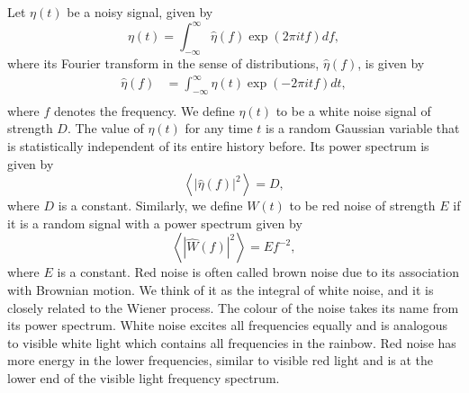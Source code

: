 Let $\eta(t)$ be a noisy signal, given by
\begin{equation}
    \eta(t) = \int_{-\infty}^\infty \hat{\eta}(f)\exp(2\pi i t f) df,
\end{equation}
where its Fourier transform in the sense of distributions, $\hat{\eta}(f)$, is given by
\begin{equation}
    \begin{aligned}
    \hat{\eta}(f) &= \int_{-\infty}^\infty \eta(t)\exp(-2\pi i t f) dt, \\
    \end{aligned}
\end{equation}
where $f$ denotes the frequency. We define $\eta(t)$ to be a white noise signal of strength $D$. The value of $\eta(t)$ for any time $t$ is a random Gaussian variable that is statistically independent of its entire history before. Its power spectrum is given by
\begin{equation}
    \left\langle|\hat{\eta}(f)|^2\right\rangle = D,
\end{equation}
where $D$ is a constant.
Similarly, we define $W(t)$ to be red noise of strength $E$ if it is a random signal with a power spectrum given by
\begin{equation}
    \left\langle|\hat{W}(f)|^2\right\rangle = E f^{-2},
\end{equation}
where $E$ is a constant. Red noise is often called brown noise due to its association with Brownian motion. We think of it as the integral of white noise, and it is closely related to the Wiener process. The colour of the noise takes its name from its power spectrum. White noise excites all frequencies equally and is analogous to visible white light which contains all frequencies in the rainbow. Red noise has more energy in the lower frequencies, similar to visible red light and is at the lower end of the visible light frequency spectrum.

